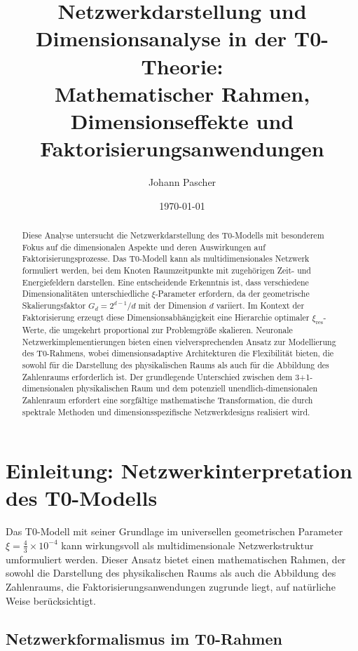 \documentclass[12pt,a4paper]{article}
\title{Netzwerkdarstellung und Dimensionsanalyse in der T0-Theorie:\\
	\large Mathematischer Rahmen, Dimensionseffekte und Faktorisierungsanwendungen}
\author{Johann Pascher}
\date{\today}
\newcommand{\xipar}{\ensuremath{\xi}}
\newcommand{\mytimes}{\ensuremath{\times}}
\begin{document}
	
	\maketitle
	
	\begin{abstract}
		Diese Analyse untersucht die Netzwerkdarstellung des T0-Modells mit besonderem Fokus auf die dimensionalen Aspekte und deren Auswirkungen auf Faktorisierungsprozesse. Das T0-Modell kann als multidimensionales Netzwerk formuliert werden, bei dem Knoten Raumzeitpunkte mit zugehörigen Zeit- und Energiefeldern darstellen. Eine entscheidende Erkenntnis ist, dass verschiedene Dimensionalitäten unterschiedliche $\xi$-Parameter erfordern, da der geometrische Skalierungsfaktor $G_d = 2^{d-1}/d$ mit der Dimension $d$ variiert. Im Kontext der Faktorisierung erzeugt diese Dimensionsabhängigkeit eine Hierarchie optimaler $\xi_{\text{res}}$-Werte, die umgekehrt proportional zur Problemgröße skalieren. Neuronale Netzwerkimplementierungen bieten einen vielversprechenden Ansatz zur Modellierung des T0-Rahmens, wobei dimensionsadaptive Architekturen die Flexibilität bieten, die sowohl für die Darstellung des physikalischen Raums als auch für die Abbildung des Zahlenraums erforderlich ist. Der grundlegende Unterschied zwischen dem 3+1-dimensionalen physikalischen Raum und dem potenziell unendlich-dimensionalen Zahlenraum erfordert eine sorgfältige mathematische Transformation, die durch spektrale Methoden und dimensionsspezifische Netzwerkdesigns realisiert wird.
	\end{abstract}
	
	\tableofcontents
	\newpage
	
	\section{Einleitung: Netzwerkinterpretation des T0-Modells}
	\label{sec:introduction}
	
	Das T0-Modell mit seiner Grundlage im universellen geometrischen Parameter $\xipar = \frac{4}{3} \mytimes 10^{-4}$ kann wirkungsvoll als multidimensionale Netzwerkstruktur umformuliert werden. Dieser Ansatz bietet einen mathematischen Rahmen, der sowohl die Darstellung des physikalischen Raums als auch die Abbildung des Zahlenraums, die Faktorisierungsanwendungen zugrunde liegt, auf natürliche Weise berücksichtigt.
	
	\subsection{Netzwerkformalismus im T0-Rahmen}
	\label{subsec:network_formalism}
	
\end{document}
